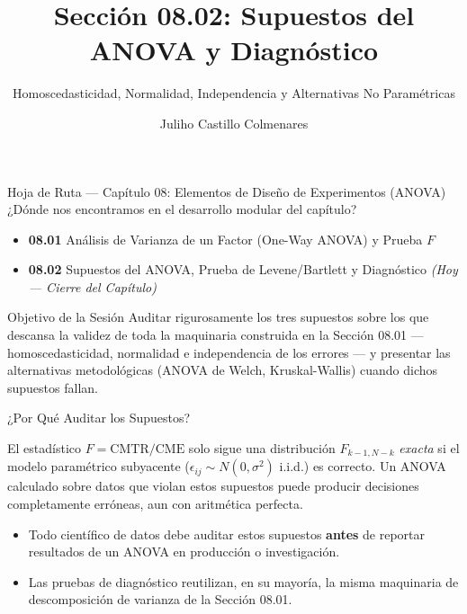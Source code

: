 \documentclass[10pt, aspectratio=169]{beamer}
\title[Supuestos del ANOVA]{Sección 08.02: Supuestos del ANOVA y Diagnóstico}
\subtitle{Homoscedasticidad, Normalidad, Independencia y Alternativas No Paramétricas}
\author[J. Castillo Colmenares]{Juliho Castillo Colmenares}
\institute{Tecnológico de Monterrey}
\date{\vspace{-1.2cm}}
\begin{document}
\begin{frame}[plain]
  \vspace{-0.8cm}
  \titlepage
\end{frame}

\begin{frame}{Hoja de Ruta --- Capítulo 08: Elementos de Diseño de Experimentos (ANOVA)}
  \footnotesize
  ¿Dónde nos encontramos en el desarrollo modular del capítulo? \pause
  \begin{itemize}\itemsep=0.08em
    \item \textbf{08.01} Análisis de Varianza de un Factor (One-Way ANOVA) y Prueba $F$ \pause
    \item \textbf{08.02} Supuestos del ANOVA, Prueba de Levene/Bartlett y Diagnóstico \emph{(Hoy --- Cierre del Capítulo)}
  \end{itemize}
  \vspace{-0.05cm}
  \begin{block}{Objetivo de la Sesión}
    Auditar rigurosamente los tres supuestos sobre los que descansa la validez de toda la maquinaria construida en la Sección 08.01 --- homoscedasticidad, normalidad e independencia de los errores --- y presentar las alternativas metodológicas (ANOVA de Welch, Kruskal-Wallis) cuando dichos supuestos fallan.
  \end{block}
\end{frame}

\begin{frame}{¿Por Qué Auditar los Supuestos?}
  \footnotesize
  \begin{motivacion}
    El estadístico $F=\text{CMTR}/\text{CME}$ solo sigue una distribución $F_{k-1,N-k}$ \emph{exacta} si el modelo paramétrico subyacente ($\epsilon_{ij}\sim N(0,\sigma^2)$ i.i.d.) es correcto. Un ANOVA calculado sobre datos que violan estos supuestos puede producir decisiones completamente erróneas, aun con aritmética perfecta.
  \end{motivacion}

  \vspace{0.15cm}
  \pause
  \begin{itemize}\itemsep=0.1cm
    \item Todo científico de datos debe auditar estos supuestos \textbf{antes} de reportar resultados de un ANOVA en producción o investigación. \pause
    \item Las pruebas de diagnóstico reutilizan, en su mayoría, la misma maquinaria de descomposición de varianza de la Sección 08.01.
  \end{itemize}
\end{frame}
\end{document}
